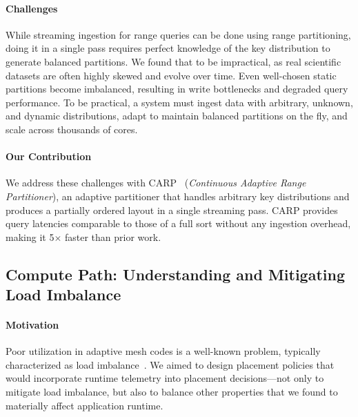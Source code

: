 \paragraph{Challenges}
While streaming ingestion for range queries can be done using range partitioning, doing it in a
single pass requires perfect knowledge of the key distribution to generate balanced partitions.
We found that to be impractical, as real scientific datasets are often highly skewed and evolve
over time.
Even well-chosen static partitions become imbalanced, resulting in write bottlenecks and degraded
query performance.
To be practical, a system must ingest data with arbitrary, unknown, and dynamic distributions,
adapt to maintain balanced partitions on the fly, and scale across thousands of cores.

\paragraph{Our Contribution}
We address these challenges with CARP~\cite{Jain2024:CARP} (\emph{Continuous Adaptive Range
  Partitioner}), an adaptive partitioner that handles arbitrary key distributions and produces a
partially ordered layout in a single streaming pass.
CARP provides query latencies comparable to those of a full sort without any ingestion overhead,
making it 5$\times$ faster than prior work.


\subsection{Compute Path: Understanding and Mitigating Load Imbalance}

\paragraph{Motivation}
Poor utilization in adaptive mesh codes is a well-known problem, typically characterized as load
imbalance~\cite{Klenk2017:OverviewMPICharacteristics,Dubey2014:Survey,Burst2008:ALPS}.
We aimed to design placement policies that would incorporate runtime telemetry into placement
decisions---not only to mitigate load imbalance, but also to balance other properties that we found
to materially affect application runtime.

